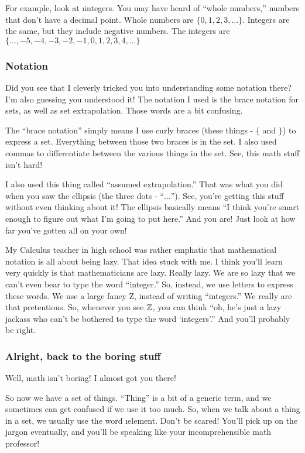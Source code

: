 For example, look at \i{integers}. You may have heard of ``whole numbers,''
numbers that don't have a decimal point. Whole numbers are $\{0, 1, 2, 3,
\ldots\}$. Integers are the same, but they include negative numbers. The
integers are $\{\ldots, -5, -4, -3, -2, -1, 0, 1, 2, 3, 4, \ldots\}$

\subsubsection{Notation}

Did you see that I cleverly tricked you into understanding some notation there?
I'm also guessing you understood it! The notation I used is the brace notation
for sets, as well as set extrapolation. Those words are a bit confusing.

The ``brace notation'' simply means I use curly braces (these things - $\{$ and
$\}$) to express a set. Everything between those two braces is in the set. I
also used commas to differentiate between the various things in the set. See,
this math stuff isn't hard!

I also used this thing called ``assumed extrapolation.'' That was what you did
when you saw the ellipsis (the three dots - ``$\ldots$''). See, you're getting
this stuff without even thinking about it! The ellipsis basically means ``I
think you're smart enough to figure out what I'm going to put here.'' And you
are! Just look at how far you've gotten all on your own!

My Calculus teacher in high school was rather emphatic that mathematical
notation is all about being lazy. That idea stuck with me. I think you'll learn
very quickly is that mathematicians are lazy. Really lazy. We are so lazy that
we can't even bear to type the word ``integer.'' So, instead, we use letters to
express these words. We use a large fancy Z, instead of writing ``integers.'' We
really are that pretentious. So, whenever you see $\mathbb{Z}$, you can think ``oh, he's
just a lazy jackass who can't be bothered to type the word `integers'.'' And
you'll probably be right.

\subsubsection{Alright, back to the boring stuff}

Well, math isn't boring! I almost got you there!

So now we have a set of things. ``Thing'' is a bit of a generic term, and we
sometimes can get confused if we use it too much. So, when we talk about a thing
in a set, we usually use the word \i{element}. Don't be scared! You'll pick up
on the jargon eventually, and you'll be speaking like your incomprehensible math
professor!

